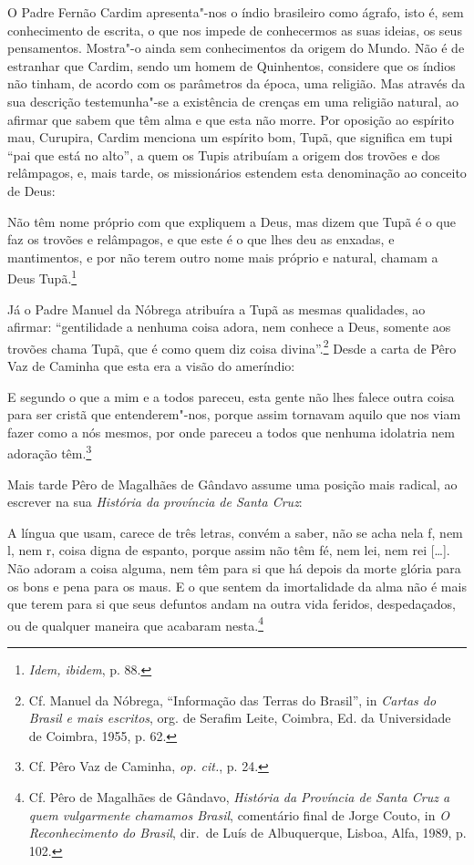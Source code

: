 O Padre Fernão Cardim apresenta"-nos o índio brasileiro como ágrafo,
isto é, sem conhecimento de escrita, o que nos impede de conhecermos as
suas ideias, os seus pensamentos. Mostra"-o ainda sem conhecimentos da
origem do Mundo. Não é de estranhar que Cardim, sendo um homem de
Quinhentos, considere que os índios não tinham, de acordo com os parâmetros
da época, uma religião. Mas através da sua descrição testemunha"-se a
existência de crenças em uma religião natural, ao afirmar que sabem que
têm alma e que esta não morre. Por oposição ao espírito mau,
Curupira, Cardim menciona um espírito bom, Tupã, que
significa em tupi ``pai que está no alto'', a quem os Tupis atribuíam a
origem dos trovões e dos relâmpagos, e, mais tarde, os missionários
estendem esta denominação ao conceito de Deus:

\begin{hedraquote}
Não têm nome próprio com que expliquem a Deus, mas dizem que
Tupã é o que faz os trovões e relâmpagos, e que este é o que lhes deu
as enxadas, e mantimentos, e por não terem outro nome mais próprio e
natural, chamam a Deus Tupã.\footnote{ \textit{Idem, ibidem}, p. 88.} 
\end{hedraquote}

Já o Padre Manuel da Nóbrega atribuíra a Tupã as mesmas qualidades,
ao afirmar: ``gentilidade a nenhuma coisa adora, nem
conhece a Deus, somente aos trovões chama Tupã, que é como quem diz
coisa divina''.\footnote{ Cf. Manuel da Nóbrega, ``Informação das
Terras do Brasil'', in \textit{Cartas do Brasil e mais escritos}, org.
de Serafim Leite, Coimbra, Ed. da Universidade de Coimbra, 1955, p.
62.} Desde a carta de Pêro Vaz de Caminha que esta era a
visão do ameríndio:

\begin{hedraquote}
E segundo o que a mim e a todos
pareceu, esta gente não lhes falece outra coisa para ser cristã que
entenderem"-nos, porque assim tornavam aquilo que nos viam fazer como a
nós mesmos, por onde pareceu a todos que nenhuma idolatria nem adoração
têm.\footnote{ Cf. Pêro Vaz de Caminha, \textit{op. cit.}, p. 24.}
\end{hedraquote}

Mais tarde Pêro de Magalhães de Gândavo assume uma posição mais radical,
ao escrever na sua \textit{História da província de Santa Cruz}:

\begin{hedraquote} 
[\ldots{}] A língua que usam, carece de três letras, convém
a saber, não se acha nela f, nem l, nem r, coisa digna de espanto, 
porque assim não têm fé, nem lei, nem rei [\ldots{}]. 
Não adoram a coisa alguma, nem têm para si que há depois da
morte glória para os bons e pena para os maus. E o que sentem da
imortalidade da alma não é mais que terem para si que seus defuntos
andam na outra vida feridos, despedaçados, ou de qualquer maneira que
acabaram nesta.\footnote{ Cf. Pêro de Magalhães de Gândavo,
\textit{História da Província de Santa Cruz a quem vulgarmente chamamos
Brasil}, comentário final de Jorge Couto, in \textit{O Reconhecimento do Brasil}, 
dir.~de Luís de Albuquerque, Lisboa, Alfa, 1989, p. 102.} 
\end{hedraquote}

